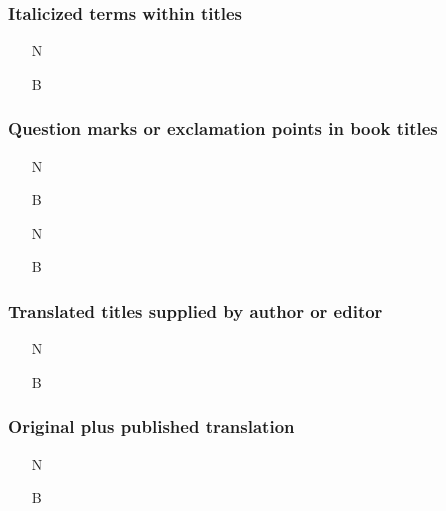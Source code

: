 \documentclass[11pt,letterpaper,oneside]{article}
\begin{document}
\setcounter{subsubsection}{102}
\subsubsection{Italicized terms within titles}

\begin{itemize}
\item[N] 

\item[B] 
\end{itemize}

\setcounter{subsubsection}{104}
\subsubsection{Question marks or exclamation points in book titles}

\begin{itemize}
\item[N] 

\item[B] 

\item[N] 

\item[B] 
\end{itemize}

\setcounter{subsubsection}{107}
\subsubsection{Translated titles supplied by author or editor}

\begin{itemize}
\item[N] 

\item[B] 
\end{itemize}

\setcounter{subsubsection}{108}
\subsubsection{Original plus published translation}

\begin{itemize}
\item[N] 

\item[B] 
\end{itemize}
\end{document}
